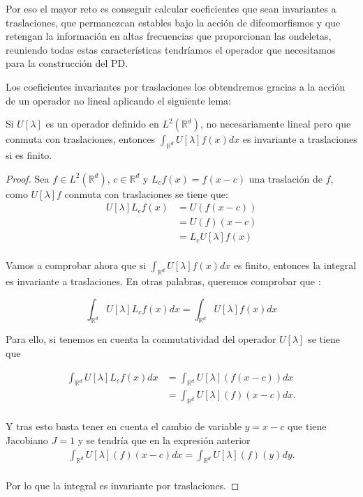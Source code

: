 \noindent Por eso el mayor reto es conseguir calcular coeficientes que sean invariantes a traslaciones, que permanezcan estables bajo la acción de difeomorfismos y que retengan la información en altas frecuencias que proporcionan las ondeletas, reuniendo todas estas características tendríamos el operador que necesitamos para la construcción del PD. 

\medskip 

\noindent Los coeficientes invariantes por traslaciones los obtendremos gracias a la acción de un operador no lineal aplicando el siguiente lema: 

\begin{lema} \label{lema:Invarianza_traslaciones_integral}
  Si $U[\lambda]$ es un operador definido en $L^2(\mathbb{R}^d)$, no necesariamente lineal pero que conmuta con traslaciones, entonces $\int_{\mathbb{R}^d} U[\lambda]f(x)dx$ es invariante a traslaciones si es finito.
\end{lema}

\begin{proof}
  Sea $f \in L^2(\mathbb{R}^d)$, $c \in \mathbb{R}^d$ y $L_cf(x)=f(x-c)$ una traslación de $f$, como $U[\lambda]f$ conmuta con traslaciones se tiene que: 
  \begin{align*}
    U[\lambda]L_cf(x)&=U(f(x-c)) \\
    &=U(f)(x-c) \\
    &=L_cU[\lambda]f(x)\\
  \end{align*}

  \noindent Vamos a comprobar ahora que si $\int_{\mathbb{R}^d} U[\lambda]f(x)dx$ es finito, entonces la integral es invariante a traslaciones. En otras palabras, queremos comprobar que : 

  $$\int_{\mathbb{R}^d} U[\lambda]L_cf(x)dx=\int_{\mathbb{R}^d} U[\lambda]f(x)dx$$

  Para ello, si tenemos en cuenta la conmutatividad del operador $U[\lambda]$ se tiene que 
  
  \begin{align*}
    \int_{\mathbb{R}^d} U[\lambda]L_cf(x)dx &= \int_{\mathbb{R}^d} U[\lambda](f(x-c))dx \\
    &= \int_{\mathbb{R}^d} U[\lambda](f)(x-c)dx. \\
  \end{align*}

  \noindent Y tras esto basta tener en cuenta el cambio de variable $y=x-c$ que tiene Jacobiano $J=1$ y se tendría que en la expresión anterior
  \begin{align*}
    \int_{\mathbb{R}^d} U[\lambda](f)(x-c)dx = \int_{\mathbb{R}^d} U[\lambda](f)(y)dy .\\
  \end{align*}
  
  \noindent Por lo que la integral es invariante por traslaciones.
\end{proof}

